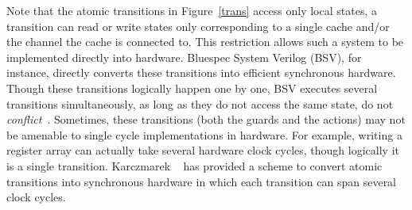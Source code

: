 Note that the atomic transitions in Figure~\ref{trans} access only local states,
\ie{} a transition can read or write states only corresponding to a single cache
and/or the channel the cache is connected to. This restriction allows such a
system to be implemented directly into hardware. Bluespec System Verilog (BSV),
for instance, directly converts these transitions into efficient synchronous
hardware. Though these transitions logically happen one by one, BSV executes
several transitions simultaneously, as long as they do not access the same
state, \ie{} do not \emph{conflict}~\cite{Hoe:TCAD,HoeArvind:TRSSynthesis1}.
Sometimes, these transitions (both the guards and the actions) may not be
amenable to single cycle implementations in hardware. For example, writing a
register array can actually take several hardware clock cycles, though
logically it is a single transition. Karczmarek \etal~\cite{Karczmarek} has
provided a scheme to convert atomic transitions into synchronous hardware in
which each transition can span several clock cycles.
